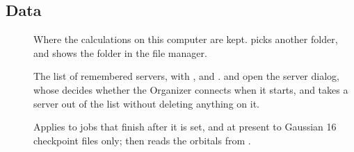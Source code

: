 \subsection*{Data}
\begin{description}
	\item[] Where the calculations on this computer are kept.  picks another folder, and  shows the folder in the file manager.
	\item[] The list of remembered servers, with ,  and .  and  open the server dialog, whose  decides whether the Organizer connects when it starts, and  takes a server out of the list without deleting anything on it.
	\item[] Applies to jobs that finish after it is set, and at present to Gaussian 16 checkpoint files only;  then reads the orbitals from .
\end{description}

